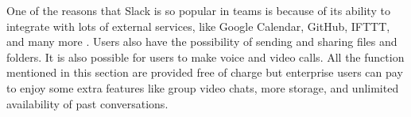 One of the reasons that Slack is so popular in teams is because of its ability to integrate with lots of external services, like Google Calendar, GitHub, IFTTT, and many more \citep{Williams2015}. Users also have the possibility of sending and sharing files and folders. It is also possible for users to make voice and video calls. All the function mentioned in this section are provided free of charge but enterprise users can pay to enjoy some extra features like group video chats, more storage, and unlimited availability of past conversations. 






